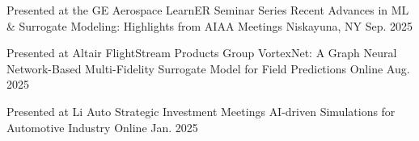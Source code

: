 
\begin{cventries}

\cvsmallentries
    {Presented at the GE Aerospace LearnER Seminar Series} %
    {Recent Advances in ML \& Surrogate Modeling: Highlights from AIAA Meetings} %
    {Niskayuna, NY} %
    {Sep. 2025} %
    {
    }

\cvsmallentries
    {Presented at Altair FlightStream Products Group} %
    {VortexNet: A Graph Neural Network-Based Multi-Fidelity Surrogate Model for Field Predictions} %
    {Online} %
    {Aug. 2025} %
    {
    }

\cvsmallentries
    {Presented at Li Auto Strategic Investment Meetings} %
    {AI-driven Simulations for Automotive Industry} %
    {Online} %
    {Jan. 2025} %
    {
    }
\end{cventries}
